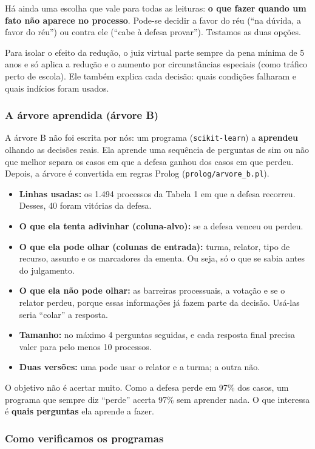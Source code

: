 \documentclass[11pt,a4paper]{article}
\begin{document}
Há ainda uma escolha que vale para todas as leituras: \textbf{o que fazer quando um fato não
aparece no processo}. Pode-se decidir a favor do réu (``na dúvida, a favor do réu'') ou
contra ele (``cabe à defesa provar''). Testamos as duas opções.

Para isolar o efeito da redução, o juiz virtual parte sempre da pena mínima de 5 anos e só
aplica a redução e o aumento por circunstâncias especiais (como tráfico perto de escola).
Ele também explica cada decisão: quais condições falharam e quais indícios foram usados.

\subsubsection*{A árvore aprendida (árvore B)}

A árvore B não foi escrita por nós: um programa (\texttt{scikit-learn}) a \textbf{aprendeu}
olhando as decisões reais. Ela aprende uma sequência de perguntas de sim ou não que melhor
separa os casos em que a defesa ganhou dos casos em que perdeu. Depois, a árvore é
convertida em regras Prolog (\texttt{prolog/arvore\_b.pl}).
\begin{itemize}
  \item \textbf{Linhas usadas:} os 1.494 processos da Tabela 1 em que a defesa recorreu.
        Desses, 40 foram vitórias da defesa.
  \item \textbf{O que ela tenta adivinhar (coluna-alvo):} se a defesa venceu ou perdeu.
  \item \textbf{O que ela pode olhar (colunas de entrada):} turma, relator, tipo de recurso,
        assunto e os marcadores da ementa. Ou seja, só o que se sabia antes do julgamento.
  \item \textbf{O que ela não pode olhar:} as barreiras processuais, a votação e se o relator
        perdeu, porque essas informações já fazem parte da decisão. Usá-las seria ``colar''
        a resposta.
  \item \textbf{Tamanho:} no máximo 4 perguntas seguidas, e cada resposta final precisa valer
        para pelo menos 10 processos.
  \item \textbf{Duas versões:} uma pode usar o relator e a turma; a outra não.
\end{itemize}
O objetivo não é acertar muito. Como a defesa perde em 97\% dos casos, um programa que
sempre diz ``perde'' acerta 97\% sem aprender nada. O que interessa é \textbf{quais
perguntas} ela aprende a fazer.

\subsubsection*{Como verificamos os programas}
\end{document}
